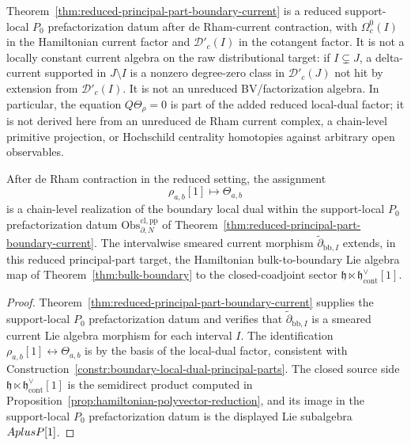 \documentclass[11pt]{memoir}
\begin{document}
\begin{rmk}\label{rmk:reduced-status-principal-part-currents}
	  Theorem~\ref{thm:reduced-principal-part-boundary-current} is a reduced
	  support-local \(P_0\) prefactorization datum after de Rham-current
  contraction, with \(\Omega_c^0(I)\) in the Hamiltonian current factor
  and \(\mathcal D'_c(I)\) in the cotangent factor.  It is not a
  locally constant current algebra on the raw distributional target:
  if \(I\subsetneq J\), a delta-current supported in \(J\setminus I\)
  is a nonzero degree-zero class in \(\mathcal D'_c(J)\) not hit by
  extension from \(\mathcal D'_c(I)\).  It is not an unreduced
  BV/factorization algebra. In particular, the equation $Q\Theta_\rho=0$
  is part of the added reduced local-dual factor; it is not derived here
  from an unreduced de Rham current complex, a chain-level primitive
  projection, or Hochschild centrality homotopies against arbitrary open
  observables.
\end{rmk}

\begin{thm}\label{thm:boundary-principal-part-cotangent-operators}
  After de Rham contraction in the reduced setting, the assignment
  $$\rho_{a,b}[1]\longmapsto\Theta_{a,b}$$
  is a chain-level realization of the boundary local dual within the
  support-local \(P_0\) prefactorization datum
  $\mathrm{Obs}_{\partial,N}^{\mathrm{cl,pp}}$ of
  Theorem~\ref{thm:reduced-principal-part-boundary-current}. The
  intervalwise smeared current morphism
  $\widetilde\partial_{\mathrm{bb},I}$ extends, in this reduced
  principal-part target, the Hamiltonian bulk-to-boundary Lie algebra map
  of Theorem~\ref{thm:bulk-boundary} to the closed-coadjoint sector
  $\mathfrak h\ltimes\mathfrak h^{\vee}_{\mathrm{cont}}[1]$.
\end{thm}

\begin{proof}
  Theorem~\ref{thm:reduced-principal-part-boundary-current} supplies the
  support-local \(P_0\) prefactorization datum and verifies that
  $\widetilde\partial_{\mathrm{bb},I}$ is a smeared current Lie algebra
  morphism for each interval \(I\). The
  identification $\rho_{a,b}[1]\leftrightarrow\Theta_{a,b}$ is by the
  basis of the local-dual factor, consistent with
  Construction~\ref{constr:boundary-local-dual-principal-parts}. The
  closed source side
  $\mathfrak h\ltimes\mathfrak h^{\vee}_{\mathrm{cont}}[1]$ is the
  semidirect product computed in
  Proposition~\ref{prop:hamiltonian-polyvector-reduction}, and its image
  in the support-local \(P_0\) prefactorization datum is the displayed Lie subalgebra
  $AplusP[1]$.
\end{proof}
\end{document}
